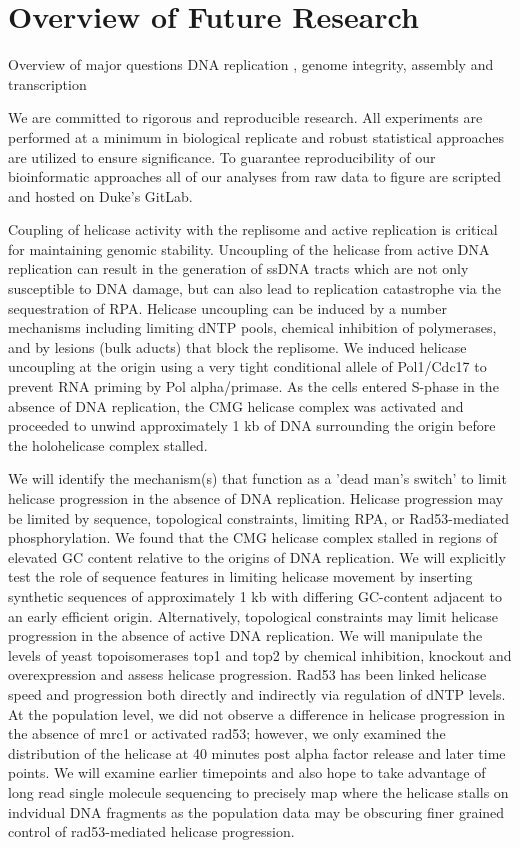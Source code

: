 \section{Overview of Future Research}
Overview of major questions DNA replication , genome integrity, assembly and transcription

We are committed to rigorous and reproducible research. All experiments are performed at a minimum in biological replicate and robust statistical approaches are utilized to ensure significance.  To guarantee reproducibility of our bioinformatic approaches all of our analyses from raw data to figure are scripted and hosted on Duke's GitLab.

Coupling of helicase activity with the replisome and active replication is critical for maintaining genomic stability.  Uncoupling of the helicase from active DNA replication can result in the generation of ssDNA tracts which are not only susceptible to DNA damage\citep{}, but can also lead to replication catastrophe via the sequestration of RPA\citep{toledo,ercilla}.  Helicase uncoupling can be induced by a number mechanisms including limiting dNTP pools, chemical inhibition of polymerases, and by lesions (\eg bulk aducts) that block the replisome. We induced helicase uncoupling at the origin using a very tight conditional allele of Pol1/Cdc17 to prevent RNA priming by Pol alpha/primase\citep{}.  As the cells entered S-phase in the absence of DNA replication, the CMG helicase complex was activated and proceeded to unwind approximately 1 kb of DNA surrounding the origin before the holohelicase complex stalled.  

We will identify the mechanism(s) that function as a 'dead man's switch' to limit helicase progression in the absence of DNA replication.  Helicase progression may be limited by sequence, topological constraints, limiting RPA, or Rad53-mediated phosphorylation.  We found that the CMG helicase complex stalled in regions of elevated GC content relative to the origins of DNA replication.  We will explicitly test the role of sequence features in limiting helicase movement by inserting synthetic sequences of approximately 1 kb with differing GC-content adjacent to an early efficient origin.  Alternatively, topological constraints may limit helicase progression in the absence of active DNA replication. We will manipulate the levels of yeast topoisomerases top1 and top2 by chemical inhibition, knockout and overexpression and assess helicase progression.   Rad53 has been linked helicase speed and progression both directly and indirectly via regulation of dNTP levels.  At the population level, we did not observe a difference in helicase progression in the absence of mrc1 or activated rad53; however, we only examined the distribution of the helicase at 40 minutes post alpha factor release and later time points. We will examine earlier timepoints and also hope to take advantage of long read single molecule sequencing to precisely map where the helicase stalls on indvidual DNA fragments as the population data may be obscuring finer grained control of rad53-mediated helicase progression.



